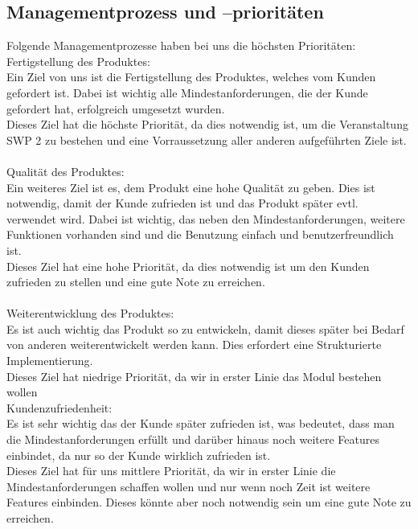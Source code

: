 \documentclass[fontsize=12pt,paper=a4,twoside]{scrartcl}
\begin{document}
\subsection{Managementprozess und --prioritäten}
Folgende Managementprozesse haben bei uns die höchsten Prioritäten:
\bigskip \\
Fertigstellung des Produktes: \\
Ein Ziel von uns ist die Fertigstellung des Produktes, welches vom Kunden gefordert ist. Dabei ist wichtig alle Mindestanforderungen, die der Kunde gefordert hat, erfolgreich umgesetzt wurden.\\
Dieses Ziel hat die höchste Priorität, da dies notwendig ist, um die Veranstaltung SWP 2 zu bestehen und eine Vorraussetzung aller anderen aufgeführten Ziele ist.\\
\bigskip \\
Qualität des Produktes: \\
Ein weiteres Ziel ist es, dem Produkt eine hohe Qualität zu geben. Dies ist notwendig, damit der Kunde zufrieden ist und das Produkt später evtl. verwendet wird. Dabei ist wichtig, das neben den Mindestanforderungen, weitere Funktionen vorhanden sind und die Benutzung einfach und benutzerfreundlich ist.\\
Dieses Ziel hat eine hohe Priorität, da dies notwendig ist um den Kunden zufrieden zu stellen und eine gute Note zu erreichen.\\
\bigskip \\
Weiterentwicklung des Produktes: \\
Es ist auch wichtig das Produkt so zu entwickeln, damit dieses später bei Bedarf von anderen weiterentwickelt werden kann. Dies erfordert eine Strukturierte Implementierung.\\
Dieses Ziel hat niedrige Priorität, da wir in erster Linie das Modul bestehen wollen
\bigskip \\
Kundenzufriedenheit:\\
Es ist sehr wichtig das der Kunde später zufrieden ist, was bedeutet, dass man die Mindestanforderungen erfüllt und darüber hinaus noch weitere Features einbindet, da nur so der Kunde wirklich zufrieden ist. \\
Dieses Ziel hat für uns mittlere Priorität, da wir in erster Linie die Mindestanforderungen schaffen wollen und nur wenn noch Zeit ist weitere Features einbinden. Dieses könnte aber noch notwendig sein um eine gute Note zu erreichen.\\
\bigskip \\
\end{document}
